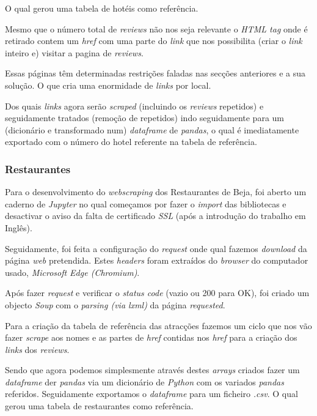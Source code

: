 O qual gerou uma tabela de hotéis como referência.

Mesmo que o número total de \textit{reviews} não nos seja relevante o \textit{HTML tag} onde é retirado contem um \textit{href} com uma parte do \textit{link} que nos possibilita (criar o \textit{link} inteiro e) visitar a pagina de \textit{reviews}.

Essas páginas têm determinadas restrições faladas nas secções anteriores e a sua solução. O que cria uma enormidade de \textit{links} por local.

Dos quais \textit{links} agora serão \textit{scraped} (incluindo os \textit{reviews} repetidos) e seguidamente tratados (remoção de repetidos) indo seguidamente para um (dicionário e transformado num) \textit{dataframe} de \textit{pandas}, o qual é imediatamente exportado com o número do hotel referente na tabela de referência.

\subsubsection{Restaurantes}
Para o desenvolvimento do \textit{webscraping} dos Restaurantes de Beja, foi aberto um caderno de \textit{Jupyter} no qual começamos por fazer o \textit{import} das bibliotecas e desactivar o aviso da falta de certificado \textit{SSL} (após a introdução do trabalho em Inglês).

Seguidamente, foi feita a configuração do \textit{request} onde qual fazemos \textit{download} da página \textit{web} pretendida. Estes \textit{headers} foram extraídos do \textit{browser} do computador usado, \textit{Microsoft Edge (Chromium)}.

Após fazer \textit{request} e verificar o \textit{status code} (vazio ou 200 para OK), foi criado um objecto \textit{Soup} com o \textit{parsing (via lxml)} da página \textit{requested}.

Para a criação da tabela de referência das atracções fazemos um ciclo que nos vão fazer \textit{scrape} aos nomes e as partes de \textit{href} contidas nos \textit{href} para a criação dos \textit{links} dos \textit{reviews}.

Sendo que agora podemos simplesmente através destes \textit{arrays} criados fazer um \textit{dataframe} der \textit{pandas} via um dicionário de \textit{Python} com os variados \textit{pandas} referidos. Seguidamente exportamos o \textit{dataframe} para um ficheiro \textit{.csv}. O qual gerou uma tabela de restaurantes como referência.

